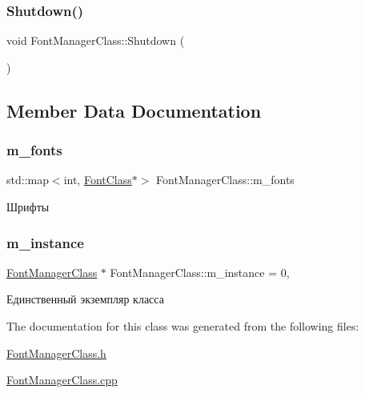 \subsubsection{\texorpdfstring{Shutdown()}{Shutdown()}}
{\footnotesize\ttfamily void Font\+Manager\+Class\+::\+Shutdown (\begin{DoxyParamCaption}{ }\end{DoxyParamCaption})}



\subsection{Member Data Documentation}
\mbox{\label{class_font_manager_class_a31bf7d784b7a4a7b2093e7f631625c6d}} 
\subsubsection{\texorpdfstring{m\+\_\+fonts}{m\_fonts}}
{\footnotesize\ttfamily std\+::map$<$int, \hyperlink{class_font_class}{Font\+Class}$\ast$$>$ Font\+Manager\+Class\+::m\+\_\+fonts\hspace{0.3cm}{\ttfamily [private]}}



Шрифты 

\mbox{\label{class_font_manager_class_a748d4e0d0e41d2284ecffcba2a647223}} 
\subsubsection{\texorpdfstring{m\+\_\+instance}{m\_instance}}
{\footnotesize\ttfamily \hyperlink{class_font_manager_class}{Font\+Manager\+Class} $\ast$ Font\+Manager\+Class\+::m\+\_\+instance = 0\hspace{0.3cm}{\ttfamily [static]}, {\ttfamily [private]}}



Единственный экземпляр класса 



The documentation for this class was generated from the following files\+:\begin{DoxyCompactItemize}
\item 
\hyperlink{_font_manager_class_8h}{Font\+Manager\+Class.\+h}\item 
\hyperlink{_font_manager_class_8cpp}{Font\+Manager\+Class.\+cpp}\end{DoxyCompactItemize}
